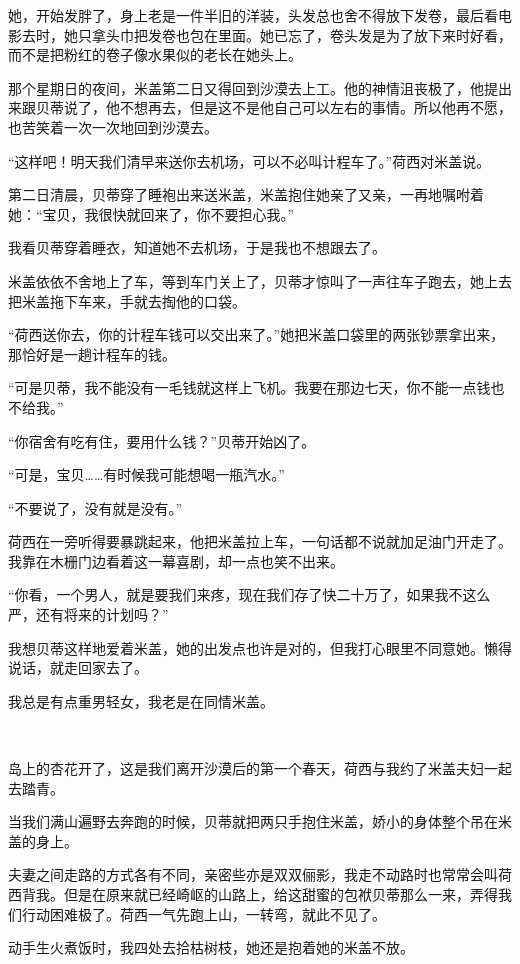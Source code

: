 \par 她，开始发胖了，身上老是一件半旧的洋装，头发总也舍不得放下发卷，最后看电影去时，她只拿头巾把发卷也包在里面。她已忘了，卷头发是为了放下来时好看，而不是把粉红的卷子像水果似的老长在她头上。
\par 那个星期日的夜间，米盖第二日又得回到沙漠去上工。他的神情沮丧极了，他提出来跟贝蒂说了，他不想再去，但是这不是他自己可以左右的事情。所以他再不愿，也苦笑着一次一次地回到沙漠去。
\par “这样吧！明天我们清早来送你去机场，可以不必叫计程车了。”荷西对米盖说。
\par 第二日清晨，贝蒂穿了睡袍出来送米盖，米盖抱住她亲了又亲，一再地嘱咐着她：“宝贝，我很快就回来了，你不要担心我。”
\par 我看贝蒂穿着睡衣，知道她不去机场，于是我也不想跟去了。
\par 米盖依依不舍地上了车，等到车门关上了，贝蒂才惊叫了一声往车子跑去，她上去把米盖拖下车来，手就去掏他的口袋。
\par “荷西送你去，你的计程车钱可以交出来了。”她把米盖口袋里的两张钞票拿出来，那恰好是一趟计程车的钱。
\par “可是贝蒂，我不能没有一毛钱就这样上飞机。我要在那边七天，你不能一点钱也不给我。”
\par “你宿舍有吃有住，要用什么钱？”贝蒂开始凶了。
\par “可是，宝贝……有时候我可能想喝一瓶汽水。”
\par “不要说了，没有就是没有。”
\par 荷西在一旁听得要暴跳起来，他把米盖拉上车，一句话都不说就加足油门开走了。我靠在木栅门边看着这一幕喜剧，却一点也笑不出来。
\par “你看，一个男人，就是要我们来疼，现在我们存了快二十万了，如果我不这么严，还有将来的计划吗？”
\par 我想贝蒂这样地爱着米盖，她的出发点也许是对的，但我打心眼里不同意她。懒得说话，就走回家去了。
\par 我总是有点重男轻女，我老是在同情米盖。
\par  
\par 岛上的杏花开了，这是我们离开沙漠后的第一个春天，荷西与我约了米盖夫妇一起去踏青。
\par 当我们满山遍野去奔跑的时候，贝蒂就把两只手抱住米盖，娇小的身体整个吊在米盖的身上。
\par 夫妻之间走路的方式各有不同，亲密些亦是双双俪影，我走不动路时也常常会叫荷西背我。但是在原来就已经崎岖的山路上，给这甜蜜的包袱贝蒂那么一来，弄得我们行动困难极了。荷西一气先跑上山，一转弯，就此不见了。
\par 动手生火煮饭时，我四处去拾枯树枝，她还是抱着她的米盖不放。
